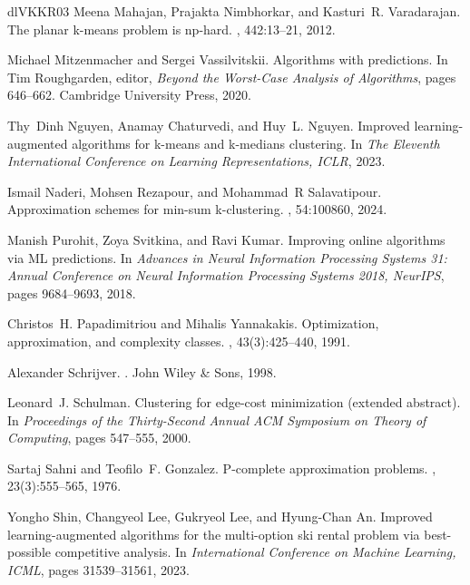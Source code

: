 \documentclass[10pt,a4paper]{amsart}
\begin{document}
\begin{thebibliography}{dlVKKR03}
Meena Mahajan, Prajakta Nimbhorkar, and Kasturi~R. Varadarajan.
\newblock The planar k-means problem is np-hard.
, 442:13--21, 2012.

Michael Mitzenmacher and Sergei Vassilvitskii.
\newblock Algorithms with predictions.
\newblock In Tim Roughgarden, editor, {\em Beyond the Worst-Case Analysis of Algorithms}, pages 646--662. Cambridge University Press, 2020.

Thy~Dinh Nguyen, Anamay Chaturvedi, and Huy~L. Nguyen.
\newblock Improved learning-augmented algorithms for k-means and k-medians clustering.
\newblock In {\em The Eleventh International Conference on Learning Representations, {ICLR}}, 2023.

Ismail Naderi, Mohsen Rezapour, and Mohammad~R Salavatipour.
\newblock Approximation schemes for min-sum k-clustering.
, 54:100860, 2024.

Manish Purohit, Zoya Svitkina, and Ravi Kumar.
\newblock Improving online algorithms via {ML} predictions.
\newblock In {\em Advances in Neural Information Processing Systems 31: Annual Conference on Neural Information Processing Systems 2018, NeurIPS}, pages 9684--9693, 2018.

Christos~H. Papadimitriou and Mihalis Yannakakis.
\newblock Optimization, approximation, and complexity classes.
, 43(3):425--440, 1991.

Alexander Schrijver.
.
\newblock John Wiley \& Sons, 1998.

Leonard~J. Schulman.
\newblock Clustering for edge-cost minimization (extended abstract).
\newblock In {\em Proceedings of the Thirty-Second Annual {ACM} Symposium on Theory of Computing}, pages 547--555, 2000.

Sartaj Sahni and Teofilo~F. Gonzalez.
\newblock P-complete approximation problems.
, 23(3):555--565, 1976.

Yongho Shin, Changyeol Lee, Gukryeol Lee, and Hyung{-}Chan An.
\newblock Improved learning-augmented algorithms for the multi-option ski rental problem via best-possible competitive analysis.
\newblock In {\em International Conference on Machine Learning, {ICML}}, pages 31539--31561, 2023.


\end{thebibliography}
\end{document}
